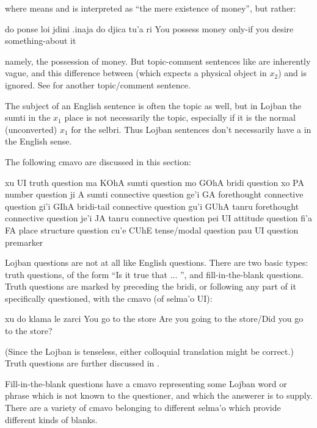 {\noindent}where  means  and is interpreted as ``the
    mere existence of money'', but rather:
\begin{example}
do ponse loi jdini .inaja do djica tu'a ri\n
You possess money only-if you desire something-about it
\end{example}

{\noindent}namely, the possession of money. But topic-comment sentences
    like  are inherently vague, and
    this difference between  (which expects a physical
    object in $x_2$) and  is ignored. See  for another topic/comment
    sentence. 

The subject of an English sentence is often the topic as
    well, but in Lojban the sumti in the $x_1$ place is not
    necessarily the topic, especially if it is the normal
    (unconverted) $x_1$ for the selbri. Thus Lojban sentences don't
    necessarily have a  in the English sense.



The following cmavo are discussed in this section:

   xu  UI  truth question
    ma  KOhA    sumti question
    mo  GOhA    bridi question
    xo  PA  number question
    ji  A   sumti connective question
    ge'i    GA  forethought connective question
    gi'i    GIhA    bridi-tail connective question
    gu'i    GUhA    tanru forethought connective question
    je'i    JA  tanru connective question
    pei UI  attitude question
    fi'a    FA  place structure question
    cu'e    CUhE    tense/modal question
    pau UI  question premarker

Lojban questions are not at all like English questions. There
    are two basic types: truth questions, of the form ``Is it true
    that ... '', and fill-in-the-blank questions. Truth questions
    are marked by preceding the bridi, or following any part of it
    specifically questioned, with the cmavo  (of selma'o UI):
\begin{example}
xu do klama le zarci\n
{} You go to the store\n
Are you going to the store/Did you go to the store?
\end{example}

(Since the Lojban is tenseless, either colloquial translation
    might be correct.) Truth questions are further discussed in . 

Fill-in-the-blank questions have a cmavo representing some
    Lojban word or phrase which is not known to the questioner, and
    which the answerer is to supply. There are a variety of cmavo
    belonging to different selma'o which provide different kinds of
    blanks.

